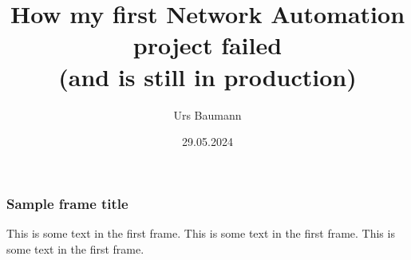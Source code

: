 \documentclass[aspectratio=169]{beamer}
\title[How my first Network Automation project failed (and is still in production)]{How my first Network Automation project failed \\ (and is still in production)}
\author{Urs Baumann}
\institute{Swisscom}
\date{29.05.2024}
\begin{document}
\frame{\titlepage}

\begin{frame}
    \frametitle{Sample frame title}
    This is some text in the first frame. This is some text in the first frame. This is some text in the first frame.
\end{frame}
\end{document}
